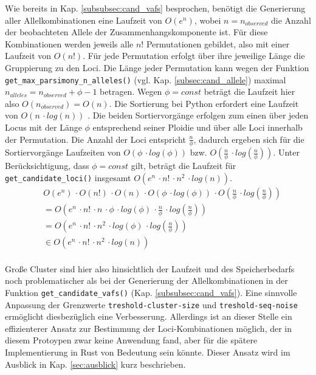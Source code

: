 Wie bereits in Kap. \ref{subsubsec:cand_vafs} besprochen, benötigt die Generierung aller Allelkombinationen eine Laufzeit von $ O(e^n) $, wobei $n = n_{observed}$ die Anzahl der beobachteten Allele der Zusammenhangskomponente ist. Für diese Kombinationen werden jeweils alle $n!$ Permutationen gebildet, also mit einer Laufzeit von $ O(n!) $. Für jede Permutation erfolgt über ihre jeweilige Länge die Gruppierung zu den Loci. Die Länge jeder Permutation kann wegen der Funktion \lstinline|get_max_parsimony_n_alleles()| (vgl. Kap. \ref{subsec:cand_allele}) maximal $ n_{alleles} = n_{observed} + \phi - 1 $ betragen. Wegen $\phi = const$ beträgt die Laufzeit hier also $O(n_{observed}) = O(n)$. Die Sortierung bei Python erfordert eine Laufzeit von $ O(n\, \cdotp log(n))$ \cite{python-sort}. Die beiden Sortiervorgänge erfolgen zum einen über jeden Locus mit der Länge $\phi$ entsprechend seiner Ploidie und über alle Loci innerhalb der Permutation. Die Anzahl der Loci entspricht $\frac{n}{\phi}$, dadurch ergeben sich für die Sortiervorgänge Laufzeiten von $ O(\phi\, \cdotp log(\phi)) $ bzw. $ O\left( \frac{n}{\phi}\, \cdotp log\left( \frac{n}{\phi}\right) \right) $. Unter Berücksichtigung, dass $\phi = const$ gilt, beträgt die Laufzeit für \lstinline|get_candidate_loci()| insgesamt $ O(e^n \, \cdotp n! \, \cdotp n^2 \, \cdotp log(n)) $.
\begin{equation} \label{eqn:3-29}
\tag{3-29}
\begin{aligned}
&\ {}O(e^n) \, \cdotp O(n!) \, \cdotp O(n) \, \cdotp O(\phi\, \cdotp log(\phi))\, \cdotp O\left( \frac{n}{\phi}\, \cdotp log\left( \frac{n}{\phi}\right) \right)  \\
&\ =O\left( e^n \, \cdotp n! \, \cdotp n\, \cdotp \phi\, \cdotp log(\phi)\, \cdotp  \frac{n}{\phi}\, \cdotp log\left( \frac{n}{\phi} \right)\right)   \\
&\ =O\left( e^n \, \cdotp n! \, \cdotp n^2 \, \cdotp log(\phi)\, \cdotp  log\left( \frac{n}{\phi} \right)\right)   \\
&\ \in O(e^n \, \cdotp n! \, \cdotp n^2 \, \cdotp log(n))
\end{aligned}
\end{equation}
\\
Große Cluster sind hier also hinsichtlich der Laufzeit und des Speicherbedarfs noch problematischer als bei der Generierung der Allelkombinationen in der Funktion \linebreak \lstinline|get_candidate_vafs()| (Kap. \ref{subsubsec:cand_vafs}). Eine sinnvolle Anpassung der Grenzwerte \linebreak \lstinline|treshold-cluster-size| und   \lstinline|treshold-seq-noise| ermöglicht diesbezüglich eine Verbesserung. Allerdings ist an dieser Stelle ein effizienterer Ansatz zur Bestimmung der Loci-Kombinationen möglich, der in diesem Protoypen zwar keine Anwendung fand, aber für die spätere Implementierung in Rust von Bedeutung sein könnte. Dieser Ansatz wird im Ausblick in Kap. \ref{sec:ausblick} kurz beschrieben.

